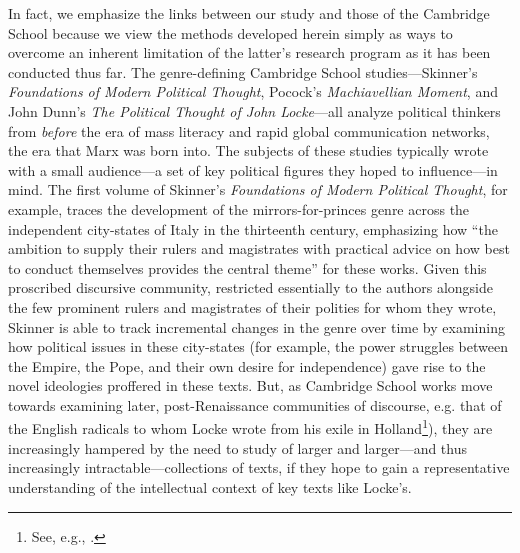 \documentclass[11pt]{article}
\begin{document}
In fact, we emphasize the links between our study and those of the Cambridge School because we view the methods developed herein simply as ways to overcome an inherent limitation of the latter's research program as it has been conducted thus far. The genre-defining Cambridge School studies---Skinner's \textit{Foundations of Modern Political Thought}, Pocock's \textit{Machiavellian Moment}, and John Dunn's \textit{The Political Thought of John Locke}---all analyze political thinkers from \textit{before} the era of mass literacy and rapid global communication networks, the era that Marx was born into. The subjects of these studies typically wrote with a small audience---a set of key political figures they hoped to influence---in mind. The first volume of Skinner's \textit{Foundations of Modern Political Thought}, for example, traces the development of the mirrors-for-princes genre across the independent city-states of Italy in the thirteenth century, emphasizing how ``the ambition to supply their rulers and magistrates with practical advice on how best to conduct themselves provides the central theme'' for these works. Given this proscribed discursive community, restricted essentially to the authors alongside the few prominent rulers and magistrates of their polities for whom they wrote, Skinner is able to track incremental changes in the genre over time by examining how political issues in these city-states (for example, the power struggles between the Empire, the Pope, and their own desire for independence) gave rise to the novel ideologies proffered in these texts. But, as Cambridge School works move towards examining later, post-Renaissance communities of discourse, e.g. that of the English radicals to whom Locke wrote from his exile in Holland\footnote{See, e.g., \cite{ashcraft_locke_1986}.}), they are increasingly hampered by the need to study of larger and larger---and thus increasingly intractable---collections of texts, if they hope to gain a representative understanding of the intellectual context of key texts like Locke's.
	
\end{document}
